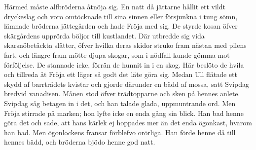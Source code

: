 Härmed måste alfbröderna åtnöja sig. En natt då jättarne hållit ett
vildt dryckeslag och voro omtöcknade till sina sinnen eller försjunkna i
tung sömn, lämnade bröderna jättegården och hade Fröja med sig. De
styrde kosan öfver skärgårdens upprörda böljor till kustlandet. Där
utbredde sig vida skarsnöbetäckta slätter, öfver hvilka deras skidor
struko fram nästan med pilens fart, och längre fram mötte djupa skogar,
som i nödfall kunde gömma mot förföljelse. De stannade icke, förrän de
hunnit in i en skog. Här beslöto de hvila och tillreda åt Fröja ett
läger så godt det läte göra sig. Medan Ull flätade ett skydd af
barrträdets kvistar och gjorde därunder en bädd af mossa, satt Svipdag
bredvid vanadisen. Månen stod öfver trädtopparne och sken på hennes
anlete. Svipdag såg betagen in i det, och han talade glada, uppmuntrande
ord. Men Fröja stirrade på marken; hon lyfte icke en enda gång sin
blick. Han bad henne göra det och sade, att hans kärlek ej hoppades mer
än det enda ögonkast, hvarom han bad. Men ögonlockens fransar förblefvo
orörliga. Han förde henne då till hennes bädd, och bröderna bjödo henne
god natt.

